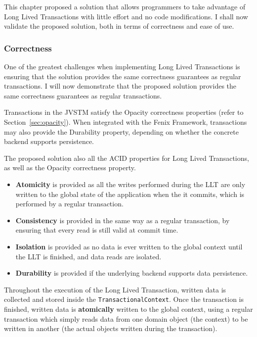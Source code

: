 \documentclass{llncs}
\begin{document}
This chapter proposed a solution that allows programmers to take
advantage of Long Lived Transactions with little effort and no code
modifications. I shall now validate the proposed solution, both in
terms of correctness and ease of use.

\subsubsection{Correctness}

One of the greatest challenges when implementing Long Lived Transactions
is ensuring that the solution provides the same correctness guarantees
as regular transactions. I will now demonstrate that the proposed
solution provides the same correctness guarantees as regular transactions.

Transactions in the JVSTM satisfy the Opacity correctness properties
(refer to Section~\ref{sec:opacity}). When integrated with the Fenix
Framework, transactions may also provide the Durability property,
depending on whether the concrete backend supports persistence.

The proposed solution also all the ACID properties for Long
Lived Transactions, as well as the Opacity correctness property.

\begin{itemize}

\item {\bf Atomicity} is provided as all the writes performed during
  the LLT are only written to the global state of the application when
  the it commits, which is performed by a regular transaction.

\item {\bf Consistency} is provided in the same way as a regular
  transaction, by ensuring that every read is still valid at commit
  time.

\item {\bf Isolation} is provided as no data is ever written to the
  global context until the LLT is finished, and data reads are isolated.

\item {\bf Durability} is provided if the underlying backend supports
  data persistence.

\end{itemize}

Throughout the execution of the Long Lived Transaction, written data
is collected and stored inside the \texttt{TransactionalContext}. Once
the transaction is finished, written data is {\bf atomically} written
to the global context, using a regular transaction which simply reads
data from one domain object (the context) to be written in another
(the actual objects written during the transaction).
\end{document}
